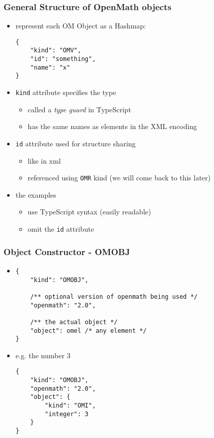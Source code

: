 \documentclass[usenames,dvipsnames]{beamer}
\begin{document}

\begin{frame}[fragile]
    \frametitle{General Structure of OpenMath objects}
    \begin{itemize}
        \item represent each OM Object as a Hashmap:
        \begin{lstlisting}
{
    "kind": "OMV",
    "id": "something",
    "name": "x"
}
    \end{lstlisting}
        \item \texttt{kind} attribute specifies the type
        \begin{itemize}
            \item called a \textit{type guard} in TypeScript
            \item has the same names as elements in the XML encoding
        \end{itemize}
        \item \texttt{id} attribute used for structure sharing
        \begin{itemize}
            \item like in xml
            \item referenced using \texttt{OMR} kind (we will come back to this later)
        \end{itemize}
        \item the examples
        \begin{itemize}
            \item use TypeScript syntax (easily readable)
            \item omit the \texttt{id} attribute
        \end{itemize}
    \end{itemize}
\end{frame}


\begin{frame}[fragile]
    \frametitle{Object Constructor - OMOBJ}
    \begin{itemize}
        \item
        \begin{lstlisting}
{
    "kind": "OMOBJ",

    /** optional version of openmath being used */
    "openmath": "2.0",

    /** the actual object */
    "object": omel /* any element */
}
    \end{lstlisting}
        \item e.g. the number $3$
\begin{lstlisting}
{
    "kind": "OMOBJ",
    "openmath": "2.0",
    "object": {
        "kind": "OMI", 
        "integer": 3
    }
}
\end{lstlisting}
    \end{itemize}
\end{frame}
\end{document}
